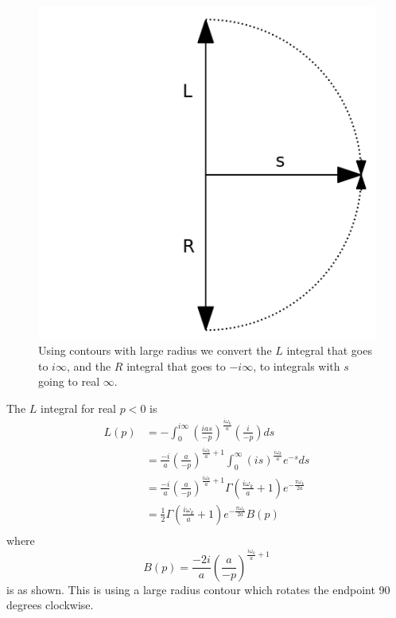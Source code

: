 \documentclass[12pt,a4paper]{article}
\begin{document}
\begin{figure}[h]
\centering
\includegraphics[scale=0.3]{contour.png}
\caption{Using contours with large radius we convert the $L$ integral that goes to $i\infty$, and the $R$ integral that goes to $-i\infty$, to integrals with $s$ going to real $\infty$.}
\label{fig:x cubed graph}
\end{figure}


The $L$ integral for real $p<0$ is
\begin{equation}
\begin{split}
  L(p) & = -\int_0^{i\infty} \left(\frac{ias}{-p}\right)^\frac{i\omega_k}{a} \left(\frac{i}{-p}\right)ds \\
  & = \frac{-i}{a} \left(\frac{a}{-p}\right)^{\frac{i\omega_k}{a} + 1} \int_0^\infty \left(is\right) ^ \frac{i\omega_k}{a} e^{-s} ds \\
  & = \frac{-i}{a} \left(\frac{a}{-p}\right)^{\frac{i\omega_k}{a} + 1} \Gamma\left(\frac{i\omega_k}{a} + 1\right) e^{-\frac{\pi \omega_k}{2a}} \\
  & = \frac{1}{2} \Gamma\left(\frac{i\omega_k}{a} + 1\right) e^{-\frac{\pi \omega_k}{2a}} B(p)\\
\end{split}
\end{equation}
where
\begin{equation}
B(p) = \frac{-2i}{a} \left(\frac{a}{-p}\right)^{\frac{i\omega_k}{a} + 1} 
\end{equation}
is as shown.  This is using a large radius contour which rotates the endpoint 90 degrees clockwise.
\end{document}

